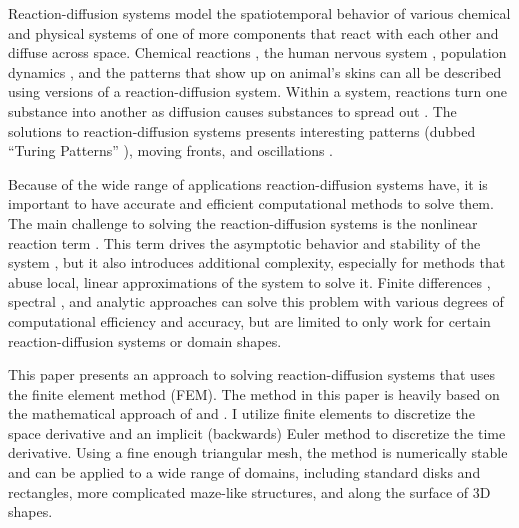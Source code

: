 Reaction-diffusion systems model the spatiotemporal behavior of various chemical and physical systems of one of more components that react with each other and diffuse across space. Chemical reactions \parencites{zhabotinsky2007belousov}{graham1993temperature}, the human nervous system \parencite{fitzhugh1961impulses}, population dynamics \parencite{clair2024reaction}, and the patterns that show up on animal's skins \parencites{turing1990chemical}{de2020leopard} can all be described using versions of a reaction-diffusion system. Within a system, reactions turn one substance into another as diffusion causes substances to spread out \parencite{li2020reaction}. The solutions to reaction-diffusion systems presents interesting patterns (dubbed ``Turing Patterns'' \parencite{vittadello2021turing}), moving fronts, and oscillations \parencites{szalai2004turing}{rinzel1982propagation}{turing1990chemical}.

Because of the wide range of applications reaction-diffusion systems have, it is important to have accurate and efficient computational methods to solve them. The main challenge to solving the reaction-diffusion systems is the nonlinear reaction term \parencites{pao1982nonlinear}{martin1992nonlinear}. This term drives the asymptotic behavior and stability of the system \parencite{pao1982nonlinear}, but it also introduces additional complexity, especially for methods that abuse local, linear approximations of the system to solve it. Finite differences \parencite{hoff1978stability}, spectral \parencites{bueno2014fourier}{craster2018spectral}, and analytic \parencites{spendier2013analytic} approaches can solve this problem with various degrees of computational efficiency and accuracy, but are limited to only work for certain reaction-diffusion systems or domain shapes.

This paper presents an approach to solving reaction-diffusion systems that uses the finite element method (FEM). The method in this paper is heavily based on the mathematical approach of \autocite{sellami2020accelerating} and \autocite{lang1992finite}. I utilize finite elements to discretize the space derivative and an implicit (backwards) Euler method to discretize the time derivative. Using a fine enough triangular mesh, the method is numerically stable and can be applied to a wide range of domains, including standard disks and rectangles, more complicated maze-like structures, and along the surface of 3D shapes.
